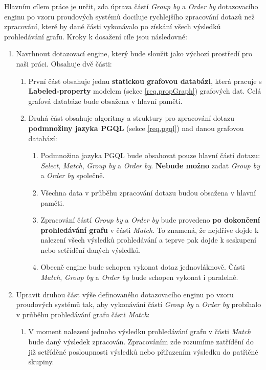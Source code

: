 Hlavním cílem práce je určit, zda úprava částí \textit{Group by} a \textit{Order by} dotazovacího enginu po vzoru proudových systémů dociluje rychlejšího zpracování dotazů než zpracování, které by dané části vykonávalo po získání všech výsledků prohledávání grafu.
Kroky k dosažení cíle jsou následovné:
\begin{enumerate}
\item
Navrhnout dotazovací engine, který bude sloužit jako výchozí prostředí pro naši práci.
Obsahuje dvě části:
\begin{enumerate}
\item První část obsahuje jednu \textbf{statickou grafovou databázi}, která pracuje s \textbf{Labeled-property} modelem (sekce \ref{req.propGraph}) grafových dat.
Celá grafová databáze bude obsažena v hlavní paměti.

\item Druhá část obsahuje algoritmy a struktury pro zpracování dotazu \textbf{podmnožiny jazyka PGQL} (sekce \ref{req.pgql}) nad danou grafovou databází:
    \begin{enumerate}
    \item Podmnožina jazyka PGQL bude obsahovat pouze hlavní částí dotazu: \textit{Select}, \textit{Match}, \textit{Group by} a \textit{Order by}.
    \textbf{Nebude možno} zadat \textit{Group by} a \textit{Order by} společně.
    \item Všechna data v průběhu zpracování dotazu budou obsažena v hlavní paměti.
    \item Zpracování částí \textit{Group by} a \textit{Order by} bude provedeno \textbf{po dokončení prohledávání grafu} v části \textit{Match}.
    To znamená, že nejdříve dojde k nalezení všech výsledků prohledávání a teprve pak dojde k seskupení nebo setřídění daných výsledků.
    \item Obecně engine bude schopen vykonat dotaz jednovláknově.
    Části \textit{Match}, \textit{Group by} a \textit{Order by} bude schopen vykonat i paralelně.
    \end{enumerate}
\end{enumerate}

\item
Upravit druhou část výše definovaného dotazovacího enginu po vzoru proudových systémů tak, aby vykonávání částí \textit{Group by} a \textit{Order by} probíhalo v průběhu prohledávání grafu části \textit{Match}:
\begin{enumerate}

\item
V moment nalezení jednoho výsledku prohledávání grafu v části \textit{Match} bude daný výsledek zpracován.
Zpracováním zde rozumíme zatřídění do již setříděné posloupnosti výsledků nebo přiřazením výsledku do patřičné skupiny.


\end{enumerate}
\end{enumerate}
